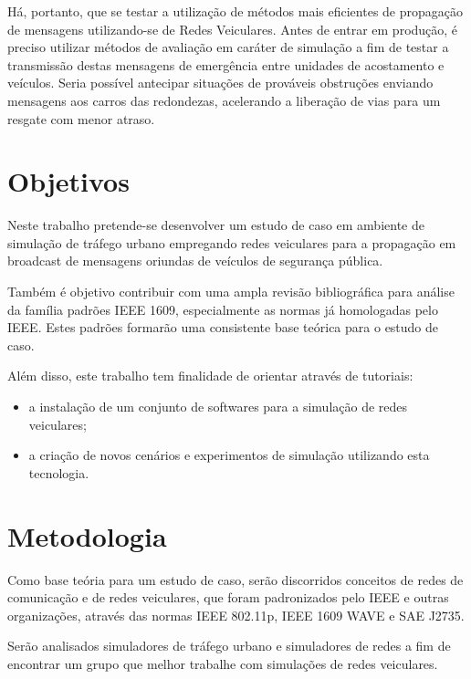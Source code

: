 \documentclass[
12pt,				%
openright,			%
oneside,			%
a4paper,			%
brazil,				%
]{abntex2}
\begin{document}
	\par Há, portanto, que se testar a utilização de métodos mais eficientes de propagação de mensagens utilizando-se de Redes Veiculares. Antes de entrar em produção, é preciso utilizar métodos de avaliação em caráter de simulação a fim de testar a transmissão destas mensagens de emergência entre unidades de acostamento e veículos. Seria possível antecipar situações de prováveis obstruções enviando mensagens aos carros das redondezas, acelerando a liberação de vias para um resgate com menor atraso. 	
	
	\section{Objetivos}
	
	\par Neste trabalho pretende-se desenvolver um estudo de caso em ambiente de simulação de tráfego urbano empregando redes veiculares para a propagação em broadcast de mensagens oriundas de veículos de segurança pública. 
	
	\par Também é objetivo contribuir com uma ampla revisão bibliográfica para análise da família padrões IEEE 1609, especialmente as normas já homologadas pelo IEEE. Estes padrões formarão uma consistente base teórica para o estudo de caso.
	
	\par Além disso, este trabalho tem finalidade de orientar através de tutoriais:
	
	\begin{itemize}
		\item a instalação de um conjunto de softwares para a simulação de redes veiculares;
		\item a criação de novos cenários e experimentos de simulação utilizando esta tecnologia.
	\end{itemize}
	
	\section{Metodologia}
	
	\par Como base teória para um estudo de caso, serão discorridos conceitos de redes de comunicação e de redes veiculares, que foram padronizados pelo IEEE e outras organizações, através das normas IEEE 802.11p, IEEE 1609 WAVE e SAE J2735. 
	
	\par Serão analisados simuladores de tráfego urbano e simuladores de redes a fim de encontrar um grupo que melhor trabalhe com simulações de redes veiculares. 
	
\end{document}
